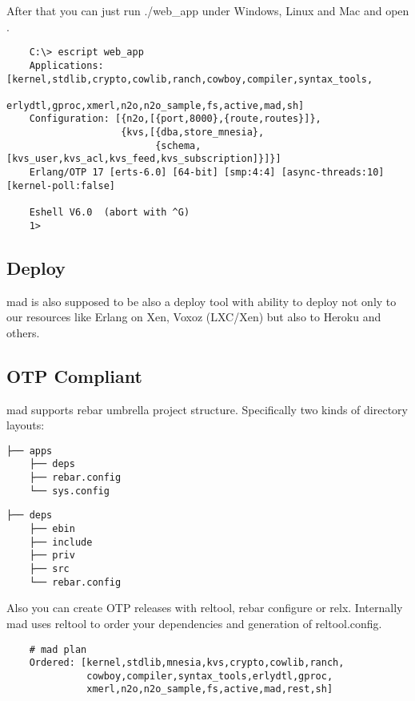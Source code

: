 After that you can just run ./web_app under Windows, Linux and
Mac and open .

\vspace{1\baselineskip}
\begin{lstlisting}
    C:\> escript web_app
    Applications: [kernel,stdlib,crypto,cowlib,ranch,cowboy,compiler,syntax_tools,
                   erlydtl,gproc,xmerl,n2o,n2o_sample,fs,active,mad,sh]
    Configuration: [{n2o,[{port,8000},{route,routes}]},
                    {kvs,[{dba,store_mnesia},
                          {schema,[kvs_user,kvs_acl,kvs_feed,kvs_subscription]}]}]
    Erlang/OTP 17 [erts-6.0] [64-bit] [smp:4:4] [async-threads:10] [kernel-poll:false]

    Eshell V6.0  (abort with ^G)
    1>
\end{lstlisting}
\vspace{1\baselineskip}

\subsection{Deploy}

mad is also supposed to be also a deploy tool with ability to
deploy not only to our resources like Erlang on Xen, Voxoz (LXC/Xen) but
also to Heroku and others.

\subsection{OTP Compliant}

mad supports rebar umbrella project structure.
Specifically two kinds of directory layouts:

\vspace{1\baselineskip}
\begin{lstlisting}[caption=Solution]
    ├── apps
    ├── deps
    ├── rebar.config
    └── sys.config
\end{lstlisting}
\vspace{1\baselineskip}

\vspace{1\baselineskip}
\begin{lstlisting}[caption=OTP Application]
    ├── deps
    ├── ebin
    ├── include
    ├── priv
    ├── src
    └── rebar.config
\end{lstlisting}
\vspace{1\baselineskip}

Also you can create OTP releases with reltool, rebar configure or relx.
Internally mad uses reltool to order your dependencies and generation of reltool.config.

\vspace{1\baselineskip}
\begin{lstlisting}
    # mad plan
    Ordered: [kernel,stdlib,mnesia,kvs,crypto,cowlib,ranch,
              cowboy,compiler,syntax_tools,erlydtl,gproc,
              xmerl,n2o,n2o_sample,fs,active,mad,rest,sh]
\end{lstlisting}
\vspace{1\baselineskip}
